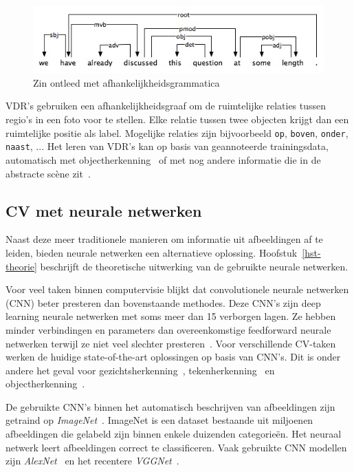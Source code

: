 \begin{figure}[tb]
	\centering
	\includegraphics[width=\linewidth]{Images/dependencygrammar.jpg}
    \caption[Zin ontleed met afhankelijkheidsgrammatica]{Zin ontleed met afhankelijkheidsgrammatica~\cite{GasserNotes}}
	\label{fig:dep_grammar}
\end{figure}  

VDR's gebruiken een afhankelijkheidsgraaf om de ruimtelijke relaties tussen regio's in een foto voor te stellen. Elke relatie tussen twee objecten krijgt dan een ruimtelijke positie als label. Mogelijke relaties zijn bijvoorbeeld \texttt{op}, \texttt{boven}, \texttt{onder}, \texttt{naast}, ... Het leren van VDR's kan op basis van geannoteerde trainingsdata, automatisch met objectherkenning~\cite{Elliott2015} of met nog andere informatie die in de abstracte sc\`ene zit~\cite{Gilberto2015}.  


\subsection{CV met neurale netwerken}
Naast deze meer traditionele manieren om informatie uit afbeeldingen af te leiden, bieden neurale netwerken een alternatieve oplossing. Hoofstuk~\ref{hst-theorie} beschrijft de theoretische uitwerking van de gebruikte neurale netwerken.

Voor veel taken binnen computervisie blijkt dat convolutionele neurale netwerken (CNN) beter presteren dan bovenstaande methodes. Deze CNN's zijn deep learning neurale netwerken met soms meer dan 15 verborgen lagen. Ze hebben minder verbindingen en parameters dan overeenkomstige feedforward neurale netwerken terwijl ze niet veel slechter presteren~\cite{Krizhevsky2012a}. 
Voor verschillende CV-taken werken de huidige state-of-the-art oplossingen op basis van CNN's. Dit is onder andere het geval voor gezichtsherkenning~\cite{Zhou2015}, tekenherkenning~\cite{Ciresan2012} en objectherkenning~\cite{Szegedy2014}.

De gebruikte CNN's binnen het automatisch beschrijven van afbeeldingen zijn getraind op \emph{ImageNet}~\cite{Russakovsky2014}. ImageNet is een dataset bestaande uit miljoenen afbeeldingen die gelabeld zijn binnen enkele duizenden categorie\"en. Het neuraal netwerk leert afbeeldingen correct te classificeren. Vaak gebruikte CNN modellen zijn \emph{AlexNet}~\cite{Krizhevsky2012a} en het recentere \emph{VGGNet}~\cite{Arge2015}.

